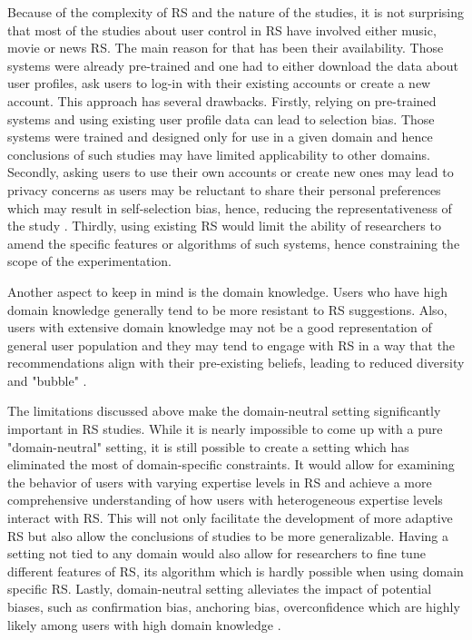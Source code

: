 \documentclass[a4paper,12pt]{article}
\begin{document}
Because of the complexity of RS and the nature of the studies, it is not surprising that most of the studies about user control in RS have involved either music, movie or news RS. The main reason for that has been their availability. Those systems were already pre-trained and one had to either download the data about user profiles, ask users to log-in with their existing accounts or create a new account. This approach has several drawbacks. Firstly, relying on pre-trained systems and using existing user profile data can lead to selection bias. Those systems were trained and designed only for use in a given domain and hence conclusions of such studies may have limited applicability to other domains. Secondly, asking users to use their own accounts or create new ones may lead to privacy concerns as users may be reluctant to share their personal preferences which may result in self-selection bias, hence, reducing the representativeness of the study \citep{belanger2011privacy}. Thirdly, using existing RS would limit the ability of researchers to amend the specific features or algorithms of such systems, hence constraining the scope of the experimentation.

Another aspect to keep in mind is the domain knowledge. Users who have high domain knowledge generally tend to be more resistant to RS suggestions. Also, users with extensive domain knowledge may not be a good representation of general user population and they may tend to engage with RS in a way that the recommendations align with their pre-existing beliefs, leading to reduced diversity and "bubble" \citep{mollerNotBlameIt2018}.  

The limitations discussed above make the domain-neutral setting significantly important in RS studies. While it is nearly impossible to come up with a pure "domain-neutral" setting, it is still possible to create a setting which has eliminated the most of domain-specific constraints. It would allow for examining the behavior of users with varying expertise levels in RS and achieve a more comprehensive understanding of how users with heterogeneous expertise levels interact with RS. This will not only facilitate the development of more adaptive RS but also allow the conclusions of studies to be more generalizable. Having a setting not tied to any domain would also allow for researchers to fine tune different features of RS, its algorithm which is hardly possible when using domain specific RS. Lastly, domain-neutral setting alleviates the impact of potential biases, such as confirmation bias, anchoring bias, overconfidence which are highly likely among users with high domain knowledge \citep{hijikata2012relation}.
\end{document}
